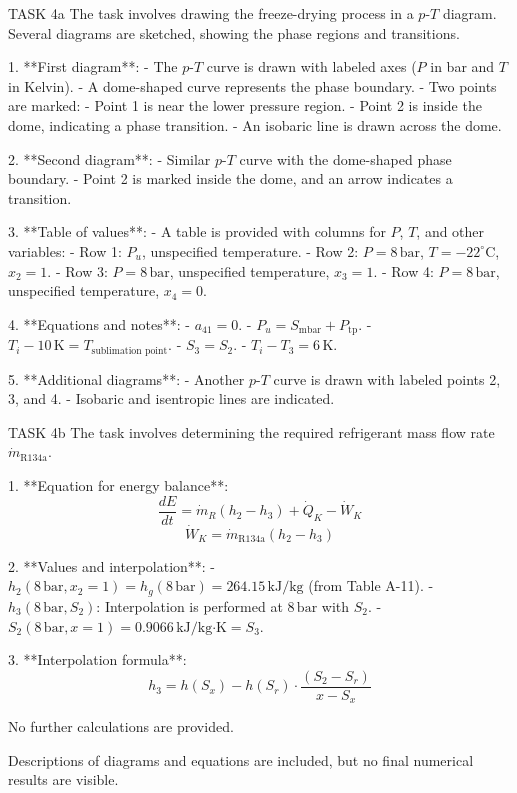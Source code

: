 TASK 4a  
The task involves drawing the freeze-drying process in a \( p \)-\( T \) diagram. Several diagrams are sketched, showing the phase regions and transitions.  

1. **First diagram**:  
   - The \( p \)-\( T \) curve is drawn with labeled axes (\( P \) in bar and \( T \) in Kelvin).  
   - A dome-shaped curve represents the phase boundary.  
   - Two points are marked:  
     - Point 1 is near the lower pressure region.  
     - Point 2 is inside the dome, indicating a phase transition.  
   - An isobaric line is drawn across the dome.  

2. **Second diagram**:  
   - Similar \( p \)-\( T \) curve with the dome-shaped phase boundary.  
   - Point 2 is marked inside the dome, and an arrow indicates a transition.  

3. **Table of values**:  
   - A table is provided with columns for \( P \), \( T \), and other variables:  
     - Row 1: \( P_u \), unspecified temperature.  
     - Row 2: \( P = 8 \, \text{bar} \), \( T = -22^\circ\text{C} \), \( x_2 = 1 \).  
     - Row 3: \( P = 8 \, \text{bar} \), unspecified temperature, \( x_3 = 1 \).  
     - Row 4: \( P = 8 \, \text{bar} \), unspecified temperature, \( x_4 = 0 \).  

4. **Equations and notes**:  
   - \( a_{41} = 0 \).  
   - \( P_u = S_{\text{mbar}} + P_{\text{tp}} \).  
   - \( T_i - 10 \, \text{K} = T_{\text{sublimation point}} \).  
   - \( S_3 = S_2 \).  
   - \( T_i - T_3 = 6 \, \text{K} \).  

5. **Additional diagrams**:  
   - Another \( p \)-\( T \) curve is drawn with labeled points 2, 3, and 4.  
   - Isobaric and isentropic lines are indicated.  

TASK 4b  
The task involves determining the required refrigerant mass flow rate \( \dot{m}_{\text{R134a}} \).  

1. **Equation for energy balance**:  
   \[
   \frac{dE}{dt} = \dot{m}_R (h_2 - h_3) + \dot{Q}_K - \dot{W}_K  
   \]  
   \[
   \dot{W}_K = \dot{m}_{\text{R134a}} (h_2 - h_3)  
   \]  

2. **Values and interpolation**:  
   - \( h_2(8 \, \text{bar}, x_2 = 1) = h_g(8 \, \text{bar}) = 264.15 \, \text{kJ/kg} \) (from Table A-11).  
   - \( h_3(8 \, \text{bar}, S_2) \): Interpolation is performed at \( 8 \, \text{bar} \) with \( S_2 \).  
   - \( S_2(8 \, \text{bar}, x = 1) = 0.9066 \, \text{kJ/kg·K} = S_3 \).  

3. **Interpolation formula**:  
   \[
   h_3 = h(S_x) - h(S_r) \cdot \frac{(S_2 - S_r)}{x - S_x}  
   \]  

No further calculations are provided.  

Descriptions of diagrams and equations are included, but no final numerical results are visible.